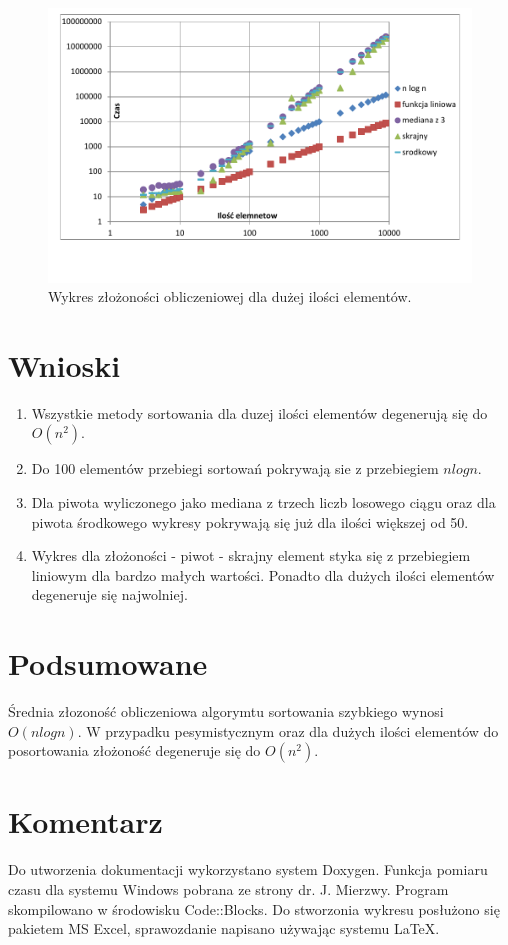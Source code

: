 \documentclass[11pt,a4paper]{article}
\begin{document}
\begin{figure}
\centering
\includegraphics[scale=0.75]{wykr.pdf}
\caption{Wykres złożoności obliczeniowej dla dużej ilości elementów.}
\label{fig:wykres1}
\end{figure}



\section{Wnioski}
\begin{enumerate}
\item Wszystkie metody sortowania dla duzej ilości elementów degenerują się do $O(n^{2}).$
\item Do 100 elementów przebiegi sortowań pokrywają sie z przebiegiem $n log n.$
\item Dla piwota wyliczonego jako mediana z trzech liczb losowego ciągu oraz dla piwota środkowego wykresy pokrywają się już dla ilości większej od 50.
\item Wykres dla złożoności - piwot - skrajny element styka się z przebiegiem liniowym dla bardzo małych wartości. Ponadto dla dużych ilości elementów degeneruje się najwolniej.
\end{enumerate}

\section{Podsumowane}
Średnia złozoność obliczeniowa algorymtu sortowania szybkiego wynosi $O(nlogn)$. W przypadku pesymistycznym oraz dla dużych ilości elementów do posortowania złożoność degeneruje się do $O(n^{2})$.


\section{Komentarz}
Do utworzenia dokumentacji wykorzystano system Doxygen.
Funkcja pomiaru czasu dla systemu Windows pobrana ze strony dr. J. Mierzwy. Program skompilowano w środowisku Code::Blocks. Do stworzonia wykresu posłużono się pakietem MS Excel, sprawozdanie napisano używając systemu \LaTeX.
\end{document}
